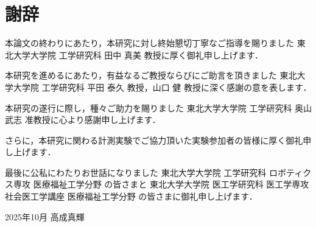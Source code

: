 \chapter*{謝辞}

本論文の終わりにあたり，本研究に対し終始懇切丁寧なご指導を賜りました 東北大学大学院 工学研究科 田中 真美 教授に厚く御礼申し上げます．

本研究を進めるにあたり，有益なるご教授ならびにご助言を頂きました 東北大学大学院 工学研究科 平田 泰久 教授，山口 健 教授に深く感謝の意を表します．

本研究の遂行に際し，種々ご助力を賜りました 東北大学大学院 工学研究科 奥山 武志 准教授に心より感謝申し上げます．

さらに，本研究に関わる計測実験でご協力頂いた実験参加者の皆様に厚く御礼申し上げます．

最後に公私にわたりお世話になりました 東北大学大学院 工学研究科 ロボティクス専攻 医療福祉工学分野 の皆さまと 東北大学大学院 医工学研究科 医工学専攻 社会医工学講座 医療福祉工学分野 の皆さまに御礼申し上げます．

\bigskip
\noindent
{\raggedleft
2025年10月 \qquad 高成真輝\par}